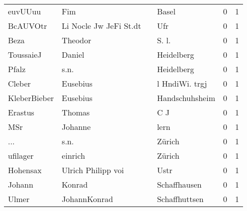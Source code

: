 \begin{tabular}{llllrr}
                  euvUUuu &                                Fim &             &                                       Basel &          0 &         1 \\
                 BcAUVOtr &             Li Nocle Jw JeFi St.dt &             &                                         Ufr &          0 &         1 \\
                     Beza &                            Theodor &             &                                      S. l.  &          0 &         1 \\
                ToussaieJ &                             Daniel &             &                                  Heidelberg &          0 &         1 \\
                    Pfalz &                               s.n. &             &                                  Heidelberg &          0 &         1 \\
                   Cleber &                           Eusebius &             &                              l HndiWi. trgj &          0 &         1 \\
             KleberBieber &                           Eusebius &             &                              Handschuhsheim &          0 &         1 \\
                  Erastus &                             Thomas &             &                                         C J &          0 &         1 \\
                      MSr &                            Johanne &             &                                        lern &          0 &         1 \\
                      ... &                               s.n. &             &                                      Zürich &          0 &         1 \\
                 ufilager &                            einrich &             &                                      Zürich &          0 &         1 \\
                 Hohensax &                 Ulrich Philipp voi &             &                                        Ustr &          0 &         1 \\
                   Johann &                             Konrad &             &                                Schaffhausen &          0 &         1 \\
                    Ulmer &                       JohannKonrad &             &                               Schaffhuttsen &          0 &         1 \\

\end{tabular}
